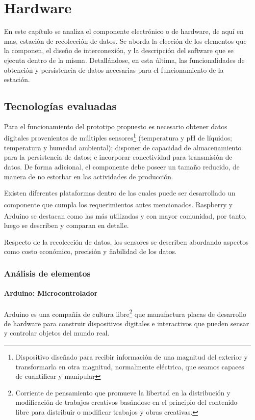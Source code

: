 \chapter{Hardware}

\par En este capítulo se analiza el componente electrónico o de hardware, de aquí en mas, estación de recolección de datos. Se aborda la elección de los elementos que la componen, el diseño de interconexión, y la descripción del software que se ejecuta dentro de la misma. Detallándose, en esta última, las funcionalidades de obtención y persistencia de datos necesarias para el funcionamiento de la estación.

\section{Tecnologías evaluadas}
    \par Para el funcionamiento del prototipo propuesto es necesario obtener datos digitales provenientes de múltiples sensores\footnote{Dispositivo diseñado para recibir información de una magnitud del exterior y transformarla en otra magnitud, normalmente eléctrica, que seamos capaces de cuantificar y manipular} (temperatura y pH de líquidos;  temperatura y humedad ambiental); disponer de capacidad de almacenamiento para la persistencia de datos; e incorporar conectividad para transmisión de datos. De forma adicional, el componente debe poseer un tamaño reducido, de manera de no estorbar en las actividades de producción.

    \par Existen diferentes plataformas dentro de las cuales puede ser desarrollado un componente que cumpla los requerimientos antes mencionados. Raspberry\textsuperscript{\textregistered} y Arduino\textsuperscript{\textregistered} se destacan como las más utilizadas y con mayor comunidad, por tanto, luego se describen y comparan en detalle.
    
    \par Respecto de la recolección de datos, los sensores se describen abordando aspectos como costo económico, precisión y fiabilidad de los datos.
    
    \subsection{Análisis de elementos}
        \subsubsection{Arduino: Microcontrolador}
            \par Arduino\textsuperscript{\textregistered} es una compañía de cultura libre\footnote{Corriente de pensamiento que promueve la libertad en la distribución y modificación de trabajos creativos basándose en el principio del contenido libre para distribuir o modificar trabajos y obras creativas.} que manufactura placas de desarrollo de hardware para construir dispositivos digitales e interactivos que pueden sensar y controlar objetos del mundo real. 
 
